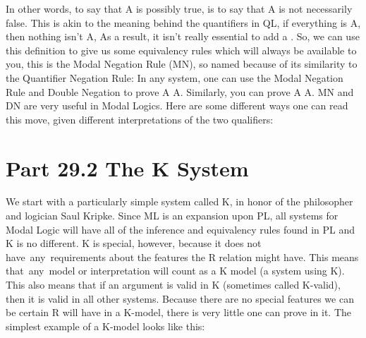 In other words, to say that A is possibly true, is to say that A is not necessarily false. This is akin to the meaning behind the quantifiers in QL, if everything is A, then nothing isn't A, As a result, it isn’t really essential to add a \ediamond . So, we can use this definition to give us some equivalency rules which will always be available to you, this is the Modal Negation Rule (MN), so named because of its similarity to the Quantifier Negation Rule:
In any system, one can use the Modal Negation Rule and Double Negation to prove \ediamond A \eiff  \enot \ebox \enot A. Similarly, you can prove \ebox A \eiff  \enot \ediamond \enot A. MN and DN are very useful in Modal Logics. Here are some different ways one can read this move, given different interpretations of the two qualifiers:
\section{Part 29.2 The K System}
We start with a particularly simple system called \Gls{K}, in honor of the philosopher and logician Saul Kripke. Since ML is an expansion upon PL, all systems for Modal Logic will have all of the inference and equivalency rules found in PL and K is no different. K is special, however, because it does not have any requirements about the features the R relation might have. This means that any model or interpretation will count as a K model (a system using K). This also means that if an argument is valid in K (sometimes called K-valid), then it is valid in all other systems. Because there are no special features we can be certain R will have in a K-model, there is very little one can prove in it. The simplest example of a K-model looks like this:

